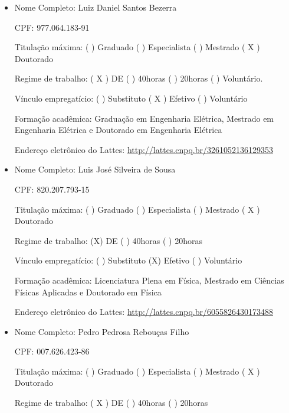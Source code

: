 \documentclass{paper}
\def\web#1{\href{#1}{#1}}
\begin{document}
\begin{itemize}
\item Nome Completo: Luiz Daniel Santos Bezerra

 CPF: 977.064.183-91

 Titulação máxima: (  ) Graduado  (  ) Especialista  (  ) Mestrado ( X ) Doutorado

 Regime de trabalho: ( X ) DE  (  ) 40horas (  ) 20horas  (  ) Voluntário.

 Vínculo empregatício: (  ) Substituto  ( X ) Efetivo  (  ) Voluntário

 Formação acadêmica: Graduação em Engenharia Elétrica, Mestrado em Engenharia Elétrica e Doutorado em Engenharia Elétrica

 Endereço eletrônico do Lattes: \web{http://lattes.cnpq.br/3261052136129353}


\item Nome Completo: Luis José Silveira de Sousa

 CPF: 820.207.793-15

 Titulação máxima: (  ) Graduado  (  ) Especialista  (  ) Mestrado ( X ) Doutorado

 Regime de trabalho: (X) DE  (  ) 40horas (  ) 20horas

 Vínculo empregatício: (  ) Substituto  (X) Efetivo  (  ) Voluntário

 Formação acadêmica: Licenciatura Plena em Física, Mestrado em Ciências Físicas Aplicadas e Doutorado em Física

 Endereço eletrônico do Lattes: \web{http://lattes.cnpq.br/6055826430173488}

%
%
%
%
%
%

\item Nome Completo: Pedro Pedrosa Rebouças Filho

 CPF: 007.626.423-86

 Titulação máxima: (  ) Graduado (  ) Especialista  (  ) Mestrado ( X ) Doutorado

 Regime de trabalho: ( X ) DE  (  ) 40horas (  ) 20horas


\end{itemize}
\end{document}
